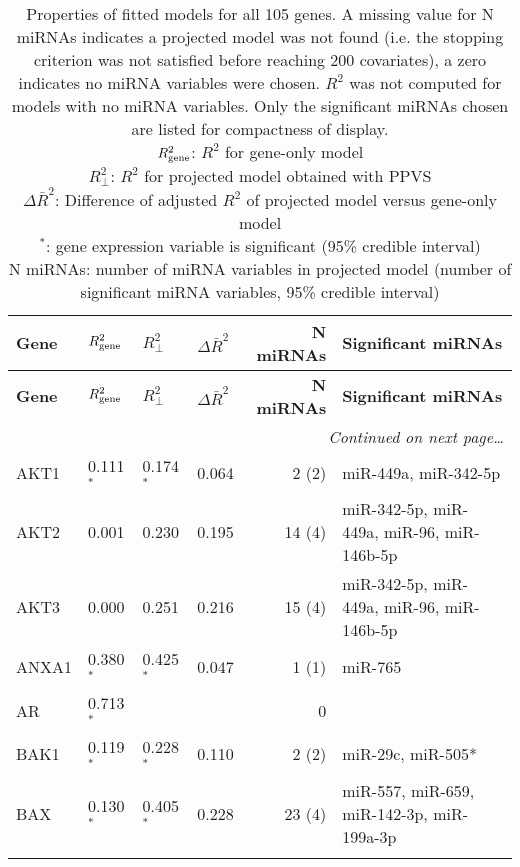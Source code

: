 { %
\footnotesize{\begin{longtable}{llllrp{7cm}}
\caption{
Properties of fitted models for all 105 genes. A missing value for N miRNAs indicates a projected model was not found
(i.e. the stopping criterion was not satisfied before reaching 200 covariates),
a zero indicates no miRNA variables were chosen.
$R^2$ was not computed for models with no miRNA variables.
Only the significant miRNAs chosen are listed for compactness of display. \\
$R^2_{\textup{gene}}$: $R^2$ for gene-only model \\
$R^2_\perp$: $R^2$ for projected model obtained with PPVS \\
$\Delta\bar{R}^2$: Difference of adjusted $R^2$ of projected model versus gene-only model \\
$^{\ast}$: gene expression variable is significant (95\% credible interval) \\
N miRNAs: number of miRNA variables in projected model (number of significant miRNA variables, 95\% credible interval) 
\label{table:final-models}
}
\label{table:finalModelTable}\\\hline
\textbf{Gene} & \textbf{$R^2_{\textup{gene}}$} & \textbf{$R^2_\perp$} & \textbf{$\Delta\bar{R}^2$} & \textbf{N miRNAs} & \textbf{Significant miRNAs}\\\hline
\endfirsthead{}%
\textbf{Gene} & \textbf{$R^2_{\textup{gene}}$} & \textbf{$R^2_\perp$} & \textbf{$\Delta\bar{R}^2$} & \textbf{N miRNAs} & \textbf{Significant miRNAs}\\\hline
\endhead\hline\multicolumn{6}{r}{\textit{Continued on next page\ldots\/}}
\endfoot\hline\endlastfoot{}%
ACACA&0.462$^{\ast}$&0.524$^{\ast}$&0.062&2 (2)&\raggedright{miR-30a, miR-370} \tabularnewline\rowcolor[rgb]{0.96,0.96,0.96}{}%
AKT1&0.111$^{\ast}$&0.174$^{\ast}$&0.064&2 (2)&\raggedright{miR-449a, miR-342-5p} \tabularnewline{}%
AKT2&0.001&0.230&0.195&14 (4)&\raggedright{miR-342-5p, miR-449a, miR-96, miR-146b-5p} \tabularnewline\rowcolor[rgb]{0.96,0.96,0.96}{}%
AKT3&0.000&0.251&0.216&15 (4)&\raggedright{miR-342-5p, miR-449a, miR-96, miR-146b-5p} \tabularnewline{}%
ANXA1&0.380$^{\ast}$&0.425$^{\ast}$&0.047&1 (1)&\raggedright{miR-765} \tabularnewline\rowcolor[rgb]{0.96,0.96,0.96}{}%
AR&0.713$^{\ast}$&&&0&\raggedright{} \tabularnewline{}%
BAK1&0.119$^{\ast}$&0.228$^{\ast}$&0.110&2 (2)&\raggedright{miR-29c, miR-505*} \tabularnewline\rowcolor[rgb]{0.96,0.96,0.96}{}%
BAX&0.130$^{\ast}$&0.405$^{\ast}$&0.228&23 (4)&\raggedright{miR-557, miR-659, miR-142-3p, miR-199a-3p} \tabularnewline{}%

\end{longtable}}}
